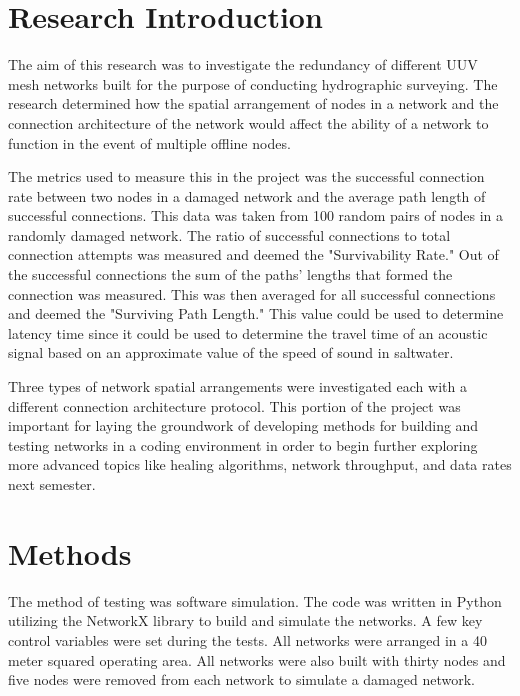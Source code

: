 \documentclass[10pt]{article}
\begin{document}
\section{Research Introduction}
The aim of this research was to investigate the redundancy of different UUV mesh networks built for the purpose of conducting hydrographic surveying. The research determined how the spatial arrangement of nodes in a network and the connection architecture of the network would affect the ability of a network to function in the event of multiple offline nodes. \par 
The metrics used to measure this in the project was the successful connection rate between two nodes in a damaged network and the average path length of successful connections. This data was taken from 100 random pairs of nodes in a randomly damaged network. The ratio of successful connections to total connection attempts was measured and deemed the "Survivability Rate." Out of the successful connections the sum of the paths' lengths that formed the connection was measured. This was then averaged for all successful connections and deemed the "Surviving Path Length." This value could be used to determine latency time since it could be used to determine the travel time of an acoustic signal based on an approximate value of the speed of sound in saltwater. \par 
Three types of network spatial arrangements were investigated each with a different connection architecture protocol. This portion of the project was important for laying the groundwork of developing methods for building and testing networks in a coding environment in order to begin further exploring more advanced topics like healing algorithms, network throughput, and data rates next semester. 


\section{Methods}
The method of testing was software simulation. The code was written in Python utilizing the NetworkX library to build and simulate the networks. A few key control variables were set during the tests. All networks were arranged in a 40 meter squared operating area. All networks were also built with thirty nodes and five nodes were removed from each network to simulate a damaged network. \par
\end{document}
